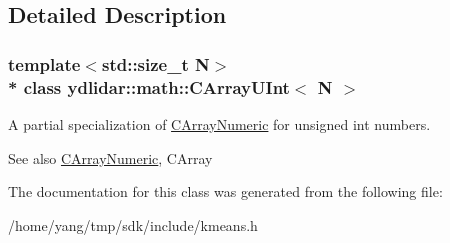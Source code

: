 \subsection{Detailed Description}
\subsubsection*{template$<$std\+::size\+\_\+t N$>$\\*
class ydlidar\+::math\+::\+C\+Array\+U\+Int$<$ N $>$}

A partial specialization of \hyperlink{classydlidar_1_1math_1_1_c_array_numeric}{C\+Array\+Numeric} for unsigned int numbers. \begin{DoxySeeAlso}{See also}
\hyperlink{classydlidar_1_1math_1_1_c_array_numeric}{C\+Array\+Numeric}, C\+Array 
\end{DoxySeeAlso}


The documentation for this class was generated from the following file\+:\begin{DoxyCompactItemize}
\item 
/home/yang/tmp/sdk/include/kmeans.\+h\end{DoxyCompactItemize}
